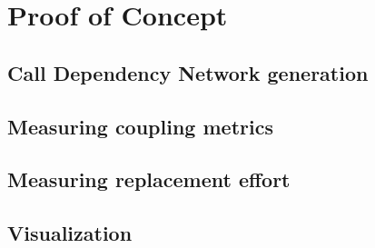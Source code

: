 \chapter{Proof of Concept}\label{ch:PoC}

\section{Call Dependency Network generation}

\section{Measuring coupling metrics}

\section{Measuring replacement effort}

\section{Visualization}
